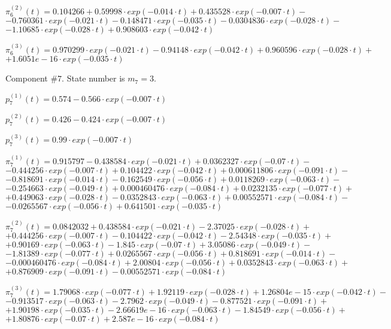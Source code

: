  $\pi^{(2)}_6(t)=0.104266+0.59998\cdot exp(-0.014\cdot t)+0.435528\cdot exp(-0.007\cdot t)-$
$-0.760361\cdot exp(-0.021\cdot t)-0.148471\cdot exp(-0.035\cdot t)-0.0304836\cdot exp(-0.028\cdot t)-$
$-1.10685\cdot exp(-0.028\cdot t)+0.908603\cdot exp(-0.042\cdot t)$

 $\pi^{(3)}_6(t)=0.970299\cdot exp(-0.021\cdot t)-0.94148\cdot exp(-0.042\cdot t)+0.960596\cdot exp(-0.028\cdot t)+$
$+1.6051e-16\cdot exp(-0.035\cdot t)$

 Component #$7$. State number is $m_7=3$.

 $p^{(1)}_7(t)=0.574-0.566\cdot exp(-0.007\cdot t)$

 $p^{(2)}_7(t)=0.426-0.424\cdot exp(-0.007\cdot t)$

 $p^{(3)}_7(t)=0.99\cdot exp(-0.007\cdot t)$

 $\pi^{(1)}_7(t)=0.915797-0.438584\cdot exp(-0.021\cdot t)+0.0362327\cdot exp(-0.07\cdot t)-$
$-0.444256\cdot exp(-0.007\cdot t)+0.104422\cdot exp(-0.042\cdot t)+0.000611806\cdot exp(-0.091\cdot t)-$
$-0.818691\cdot exp(-0.014\cdot t)-0.162549\cdot exp(-0.056\cdot t)+0.0118269\cdot exp(-0.063\cdot t)-$
$-0.254663\cdot exp(-0.049\cdot t)+0.000460476\cdot exp(-0.084\cdot t)+0.0232135\cdot exp(-0.077\cdot t)+$
$+0.449063\cdot exp(-0.028\cdot t)-0.0352843\cdot exp(-0.063\cdot t)+0.00552571\cdot exp(-0.084\cdot t)-$
$-0.0265567\cdot exp(-0.056\cdot t)+0.641501\cdot exp(-0.035\cdot t)$

 $\pi^{(2)}_7(t)=0.0842032+0.438584\cdot exp(-0.021\cdot t)-2.37025\cdot exp(-0.028\cdot t)+$
$+0.444256\cdot exp(-0.007\cdot t)-0.104422\cdot exp(-0.042\cdot t)-2.54348\cdot exp(-0.035\cdot t)+$
$+0.90169\cdot exp(-0.063\cdot t)-1.845\cdot exp(-0.07\cdot t)+3.05086\cdot exp(-0.049\cdot t)-$
$-1.81389\cdot exp(-0.077\cdot t)+0.0265567\cdot exp(-0.056\cdot t)+0.818691\cdot exp(-0.014\cdot t)-$
$-0.000460476\cdot exp(-0.084\cdot t)+2.00804\cdot exp(-0.056\cdot t)+0.0352843\cdot exp(-0.063\cdot t)+$
$+0.876909\cdot exp(-0.091\cdot t)-0.00552571\cdot exp(-0.084\cdot t)$

 $\pi^{(3)}_7(t)=1.79068\cdot exp(-0.077\cdot t)+1.92119\cdot exp(-0.028\cdot t)+1.26804e-15\cdot exp(-0.042\cdot t)-$
$-0.913517\cdot exp(-0.063\cdot t)-2.7962\cdot exp(-0.049\cdot t)-0.877521\cdot exp(-0.091\cdot t)+$
$+1.90198\cdot exp(-0.035\cdot t)-2.66619e-16\cdot exp(-0.063\cdot t)-1.84549\cdot exp(-0.056\cdot t)+$
$+1.80876\cdot exp(-0.07\cdot t)+2.587e-16\cdot exp(-0.084\cdot t)$